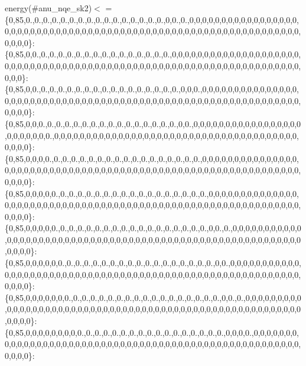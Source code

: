 energy(\#anu\+\_\+nqe\+\_\+sk2)$<$  = \{0,85,0.,0.,0.,0.,0.,0.,0.,0.,0.,0.,0.,0.,0.,0.,0.,0.,0,0.,0.,0,0,0,0,0,0,0,0,0,0,0,0,0,0,0,0,0,0,0,0,0,0,0,0,0,0,0,0,0,0,0,0,0,0,0,0,0,0,0,0,0,0,0,0,0,0,0,0,0,0,0,0,0,0,0,0,0,0,0,0,0,0,0,0,0,0,0\}\+: \{0,85,0,0.,0.,0.,0.,0.,0.,0.,0.,0.,0.,0.,0.,0.,0.,0.,0.,0,0,0,0,0,0,0,0,0,0,0,0,0,0,0,0,0,0,0,0,0,0,0,0,0,0,0,0,0,0,0,0,0,0,0,0,0,0,0,0,0,0,0,0,0,0,0,0,0,0,0,0,0,0,0,0,0,0,0,0,0,0,0,0,0,0,0,0,0\}\+: \{0,85,0,0.,0.,0.,0.,0.,0.,0.,0.,0.,0.,0.,0.,0.,0.,0.,0.,0.,0,0,0.,0,0,0,0,0,0,0,0,0,0,0,0,0,0,0,0,0,0,0,0,0,0,0,0,0,0,0,0,0,0,0,0,0,0,0,0,0,0,0,0,0,0,0,0,0,0,0,0,0,0,0,0,0,0,0,0,0,0,0,0,0,0,0,0,0\}\+: \{0,85,0,0,0.,0.,0.,0.,0.,0.,0.,0.,0.,0.,0.,0.,0.,0.,0.,0.,0,0.,0,0,0,0,0,0,0,0,0,0,0,0,0,0,0,0,0,0,0,0,0,0,0,0.,0,0,0,0,0,0,0,0,0,0,0,0,0,0,0,0,0,0,0,0,0,0,0,0,0,0,0,0,0,0,0,0,0,0,0,0,0,0,0,0,0,0\}\+: \{0,85,0,0,0,0.,0.,0.,0.,0.,0.,0.,0.,0.,0.,0.,0.,0.,0.,0.,0.,0.,0.,0,0,0,0,0,0,0,0,0,0,0,0,0,0,0,0,0,0,0,0,0,0,0,0,0,0,0,0,0,0,0,0,0,0,0,0,0,0,0,0,0,0,0,0,0,0,0,0,0,0,0,0,0,0,0,0,0,0,0,0,0,0,0,0,0\}\+: \{0,85,0,0,0,0,0.,0.,0.,0.,0.,0.,0.,0.,0.,0.,0.,0.,0.,0.,0.,0.,0.,0.,0,0,0,0,0,0,0,0,0,0,0,0,0,0,0,0,0,0,0,0,0,0,0,0,0,0,0,0,0,0,0,0,0,0,0,0,0,0,0,0,0,0,0,0,0,0,0,0,0,0,0,0,0,0,0,0,0,0,0,0,0,0,0,0\}\+: \{0,85,0,0,0,0,0.,0.,0.,0.,0.,0.,0.,0.,0.,0.,0.,0.,0.,0.,0.,0.,0.,0.,0,0.,0.,0,0,0,0,0,0,0,0,0,0,0,0,0,0,0,0,0,0,0,0,0,0,0,0,0,0,0,0,0,0,0,0,0,0,0,0,0,0,0,0,0,0,0,0,0,0,0,0,0,0,0,0,0,0,0,0,0,0,0,0,0\}\+: \{0,85,0,0,0,0,0,0.,0.,0.,0.,0.,0.,0.,0.,0.,0.,0.,0.,0.,0.,0.,0.,0.,0.,0,0.,0,0,0,0,0,0,0,0,0,0,0,0,0,0,0,0,0,0,0,0,0,0,0,0,0,0,0,0,0,0,0,0,0,0,0,0,0,0,0,0,0,0,0,0,0,0,0,0,0,0,0,0,0,0,0,0,0,0,0,0,0\}\+: \{0,85,0,0,0,0,0,0,0.,0.,0.,0.,0.,0.,0.,0.,0.,0.,0.,0.,0.,0.,0.,0.,0.,0.,0,0.,0.,0,0,0,0,0,0,0,0,0,0,0,0,0,0,0,0,0,0,0,0,0,0,0,0,0,0,0,0,0,0,0,0,0,0,0,0,0,0,0,0,0,0,0,0,0,0,0,0,0,0,0,0,0,0,0,0,0,0,0\}\+: \{0,85,0,0,0,0,0,0,0,0,0.,0.,0.,0.,0.,0.,0.,0.,0.,0.,0.,0.,0.,0.,0.,0.,0.,0,0,0,0.,0,0,0,0,0,0,0,0,0,0,0,0,0,0,0,0,0,0,0,0,0,0,0,0,0,0,0,0,0,0,0,0,0,0,0,0,0,0,0,0,0,0,0,0,0,0,0,0,0,0,0,0,0,0,0,0,0\}\+: 